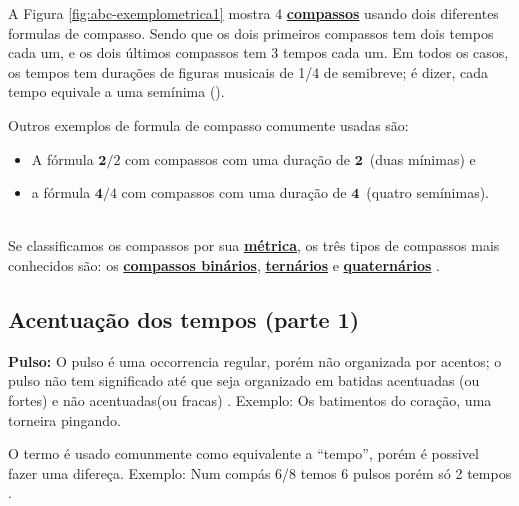 \begin{description}
\begin{example}
\end{example}
\begin{example}
A Figura \ref{fig:abc-exemplometrica1} mostra 4 \hyperref[def:Compasso]{\textbf{compassos}} usando dois diferentes formulas de compasso.
Sendo que os dois primeiros compassos tem dois tempos cada um, 
e os dois últimos compassos tem 3 tempos cada um.
Em todos os casos, os tempos tem durações de figuras musicais de 1/4 de semibreve;
é dizer, cada tempo equivale a uma semínima (\Vier). 
\end{example}
\begin{example}
Outros exemplos de formula de compasso comumente usadas são:
\begin{itemize}
\item A fórmula $\mathbf{2}/2$ com compassos com uma duração de $\mathbf{2}$\halfnote ~(duas mínimas) e
\item a fórmula $\mathbf{4}/4$ com compassos com uma duração de $\mathbf{4}$\quarternote ~(quatro semínimas). 
\end{itemize}
\end{example}
\end{description}~\\


Se classificamos os compassos por sua \hyperref[def:Metrica]{\textbf{métrica}}, 
os três tipos de compassos mais conhecidos são: 
os \hyperref[subsec:compassobinario]{\textbf{compassos binários}}, 
\hyperref[subsec:compassoternario]{\textbf{ternários}} e 
\hyperref[subsec:compassoquaternario]{\textbf{quaternários}} \cite[pp. 27]{adolfo2002musica}.



\subsection{Acentuação dos tempos (parte 1)}
\label{subsec:acentuacion1}



\begin{tcbinformation} 
\textbf{Pulso:}
\label{ref:Pulso}
O pulso é uma occorrencia regular, porém não organizada por acentos;
o pulso não tem significado até que seja organizado em batidas acentuadas (ou fortes) 
e não acentuadas(ou fracas) \cite[pp. 22]{holland2013music}. 
Exemplo: Os batimentos do coração, uma torneira pingando.

O termo é usado comunmente como equivalente a ``tempo'',
porém é possivel fazer uma difereça.
Exemplo: Num compás 6/8 temos 6 pulsos porém só 2 tempos \cite[pp. 1228]{latham2008diccionario}.
\end{tcbinformation} 


